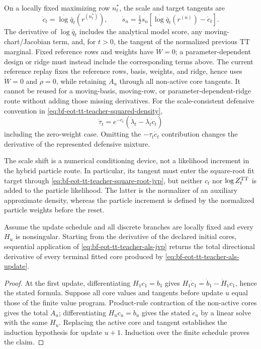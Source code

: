 On a locally fixed maximizing row \(n_t^*\), the scale and target tangents are
\begin{equation}
 \dot c_t=\dot{\log\bar q}_t(r^{(n_t^*)}),
 \qquad
 \dot s_n=\tfrac12s_n
 [\dot{\log\bar q}_t(r^{(n)})-\dot c_t].
 \label{eq:bf-eot-tt-teacher-square-root-jvp}
\end{equation}
The derivative of \(\log\bar q_t\) includes the analytical model score, any
moving-chart/Jacobian term, and, for \(t>0\), the tangent of the normalized
previous TT marginal.  Fixed reference rows and weights have
\(\dot W=0\); a parameter-dependent design or ridge must instead include the
corresponding terms above.  The current reference replay fixes the reference
rows, basis, weights, and ridge, hence uses \(\dot W=0\) and \(\dot\rho=0\),
while retaining \(\dot A_u\) through all non-active core tangents.  It cannot
be reused for a moving-basis, moving-row, or parameter-dependent-ridge route
without adding those missing derivatives.
For the scale-consistent defensive convention in
\eqref{eq:bf-eot-tt-teacher-squared-density},
\begin{equation}
 \dot\tau_t=e^{-c_t}(\dot\lambda_t-\lambda_t\dot c_t)
 \label{eq:bf-eot-tt-teacher-defensive-scale-jvp}
\end{equation}
including the zero-weight case.  Omitting the
\(-\tau_t\dot c_t\) contribution changes the derivative of the represented
defensive mixture.

The scale shift is a numerical conditioning device, not a likelihood
increment in the hybrid particle route.  In particular, its tangent must enter
the square-root fit target through
\eqref{eq:bf-eot-tt-teacher-square-root-jvp}, but neither \(c_t\) nor
\(\log Z_t^{\rm TT}\) is added to the particle likelihood.  The latter is the
normalizer of an auxiliary approximate density, whereas the particle
increment is defined by the normalized particle weights before the reset.

\begin{proposition}
\label{prop:bf-eot-tt-teacher-als-jvp}
Assume the update schedule and all discrete branches are locally fixed and
every \(H_u\) is nonsingular.  Starting from the derivative of the declared
initial cores, sequential application of
\eqref{eq:bf-eot-tt-teacher-als-jvp} returns the total directional derivative
of every terminal fitted core produced by
\eqref{eq:bf-eot-tt-teacher-als-update}.
\end{proposition}

\begin{proof}
At the first update, differentiating \(H_1c_1=b_1\) gives
\(H_1\dot c_1=\dot b_1-\dot H_1c_1\), hence the stated formula.  Suppose all
core values and tangents before update \(u\) equal those of the finite value
program.  Product-rule contraction of the non-active cores gives the total
\(\dot A_u\); differentiating \(H_uc_u=b_u\) gives the stated
\(\dot c_u\) by a linear solve with the same \(H_u\).  Replacing the active
core and tangent establishes the induction
hypothesis for update \(u+1\).  Induction over the finite schedule proves the
claim.
\end{proof}

